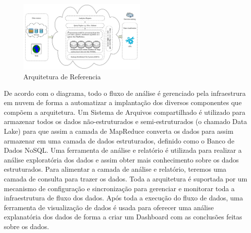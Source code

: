 \documentclass[conference]{IEEEtran}
\begin{document}
\begin{figure}[!tp]
	\centering
	\includegraphics[width=2.5in]{big-data-computing.png}
	\caption{Arquitetura de Referencia}
	\label{ref_arch}
\end{figure}

De acordo com o diagrama, todo o fluxo de an\'{a}lise \'{e} gerenciado pela infraestrura em nuvem de forma a automatizar a implanta\c{c}\~{a}o dos diversos componentes que comp\~{o}em a arquitetura. Um Sistema de Arquivos compartilhado \'{e} utilizado para armazenar todos os dados n\~{a}o-estruturados e semi-estruturados (o chamado Data Lake) para que assim a camada de MapReduce converta os dados para assim armazenar em uma camada de dados estruturados, definido como o Banco de Dados NoSQL. Uma ferramenta de an\'{a}lise e relat\'{o}rio \'{e} utilizada para realizar a an\'{a}lise explorat\'{o}ria dos dados e assim obter mais conhecimento sobre os dados estruturados. Para alimentar a camada de an\'{a}lise e relat\'{o}rio, teremos uma camada de consulta para trazer os dados. Toda a arquitetura \'{e} suportada por um mecanismo de configura\c{c}\~{a}o e sincroniza\c{c}\~{a}o para gerenciar e monitorar toda a infraestrutura de fluxo dos dados. Ap\'{o}s toda a execu\c{c}\~{a}o do fluxo de dados, uma ferramenta de visualiza\c{c}\~{a}o de dados \'{e} usada para oferecer uma an\'{a}lise explanat\'{o}ria dos dados de forma a criar um Dashboard com as conclus\~{o}es feitas sobre os dados.
\end{document}
